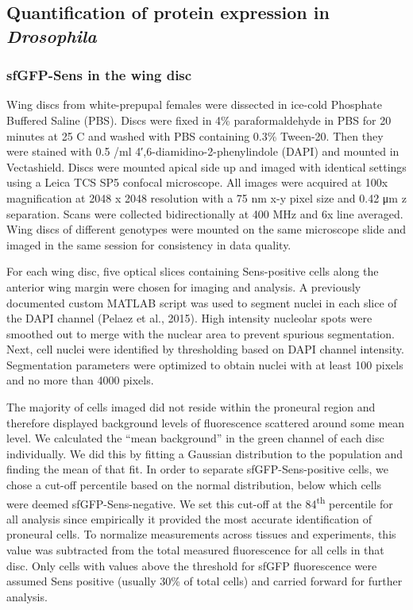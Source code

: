 \subsection{Quantification of protein expression in \textit{Drosophila}}

\subsubsection{sfGFP-Sens in the wing disc}
\label{appendix:methods:metabolism:sens}

Wing discs from white-prepupal females were dissected in ice-cold Phosphate Buffered Saline (PBS). Discs were fixed in 4\% paraformaldehyde in PBS for 20 minutes at 25 \textdegree{}C and washed with PBS containing 0.3\% Tween-20. Then they were stained with 0.5 \mug/ml 4′,6-diamidino-2-phenylindole (DAPI) and mounted in Vectashield. Discs were mounted apical side up and imaged with identical settings using a Leica TCS SP5 confocal microscope. All images were acquired at 100x magnification at 2048 x 2048 resolution with a 75 nm x-y pixel size and 0.42 μm z separation. Scans were collected bidirectionally at 400 MHz and 6x line averaged. Wing discs of different genotypes were mounted on the same microscope slide and imaged in the same session for consistency in data quality.

For each wing disc, five optical slices containing Sens-positive cells along the anterior wing margin were chosen for imaging and analysis. A previously documented custom MATLAB script was used to segment nuclei in each slice of the DAPI channel (Pelaez et al., 2015). High intensity nucleolar spots were smoothed out to merge with the nuclear area to prevent spurious segmentation. Next, cell nuclei were identified by thresholding based on DAPI channel intensity. Segmentation parameters were optimized to obtain nuclei with at least 100 pixels and no more than 4000 pixels.

The majority of cells imaged did not reside within the proneural region and therefore displayed background levels of fluorescence scattered around some mean level. We calculated the ``mean background'' in the green channel of each disc individually. We did this by fitting a Gaussian distribution to the population and finding the mean of that fit. In order to separate sfGFP-Sens-positive cells, we chose a cut-off percentile based on the normal distribution, below which cells were deemed sfGFP-Sens-negative. We set this cut-off at the 84\textsuperscript{th} percentile for all analysis since empirically it provided the most accurate identification of proneural cells. To normalize measurements across tissues and experiments, this value was subtracted from the total measured fluorescence for all cells in that disc. Only cells with values above the threshold for sfGFP fluorescence were assumed Sens positive (usually 30\% of total cells) and carried forward for further analysis.


